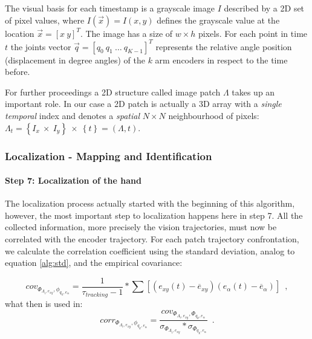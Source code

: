 The visual basis for each timestamp is a grayscale image $I$ described by a 2D set of pixel values, where $I(\vec{x})=I(x,y)$ defines the grayscale value at the location $\vec{x}=\left[x\ y\right]^T$. The image has a size of $w \times h$ pixels. 
For each point in time $t$ the joints vector $\vec{q} = \left[ q_{0}\ q_1\ \ldots\ q_{K-1} \right]^T$ represents the relative angle position (displacement in degree angles) of the $k$ arm encoders in respect to the time before. %

For further proceedings a 2D structure called image patch $\Lambda$ takes up an important role. In our case a 2D patch is actually a 3D array with a \textit{single temporal} index and denotes a \textit{spatial} $N \times N$ neighbour\-hood of pixels: $\Lambda_t = \left\{I_x\ \times\ I_y\right\}\ \times\ \left\{t\right\} = \left(\Lambda, t\right)$.



\subsubsection{Localization - Mapping and Identification}
\label{halose:halo:algorithm:localization}
%
\paragraph{Step 7: Localization of the hand}
\label{halose:halo:algorithm:step7}
%
The localization process actually started with the beginning of this algorithm, however, the most important step to localization happens here in step 7. All the collected information, more precisely the vision trajectories, must now be correlated with the encoder trajectory. For each patch trajectory confrontation, we calculate the correlation coefficient using the standard deviation, analog to equation \ref{alg:std}, and the empirical covariance:

\begin{equation}
\label{covariance}
	cov_{\Phi_{\Lambda_{i}, e_{xy}}, \phi_{q_{k}, e_{\alpha}}} = \frac{1}{\tau_{tracking}-1} * \sum \left[  \left(e_{xy}\left(t\right) - \overline{e}_{xy} \right) \left(e_{\alpha}\left(t\right) - \overline{e}_{\alpha}  \right) \right] \enspace ,
\end{equation}
what then is used in:
%
\begin{equation}
\label{correlation}
corr_{\Phi_{\Lambda_{i}, e_{xy}}, \phi_{q_{k}, e_{\alpha}}} = \frac{cov_{\Phi_{\Lambda_{i}, e_{xy}}, \Phi_{q_{k}, e_{\alpha}}}}{ \sigma_{\Phi_{\Lambda_{i}, e_{xy}}} * \sigma_{\Phi_{q_{k}, e_{\alpha}}}} \enspace .
\end{equation}

